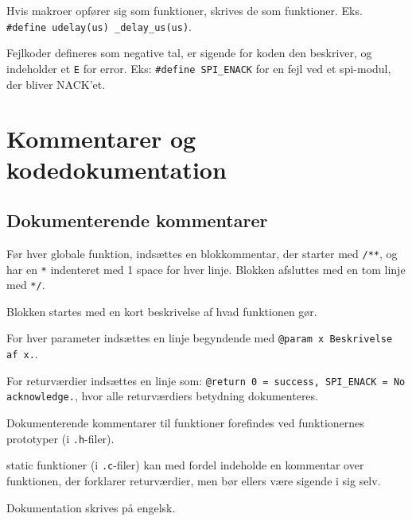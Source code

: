 \documentclass[article, 10pt]{memoir}
\let\tempone\itemize
\let\temptwo\enditemize
\renewenvironment{itemize}{\tempone\firmlist}{\temptwo}
\begin{document}
\begin{multicols}{2}
\begin{itemize}
        Hvis makroer opfører sig som funktioner, skrives de som funktioner. Eks. \texttt{\#define\ udelay(us) \_delay\_us(us)}.
    \item Fejlkoder defineres som negative tal, er sigende for koden den beskriver, og indeholder et \texttt{E} for error. Eks: \texttt{\#define SPI\_ENACK} for en fejl ved et spi-modul, der bliver NACK’et.
    \end{itemize}

    \chapter{Kommentarer og kodedokumentation}

    \section{Dokumenterende kommentarer}
    \begin{itemize}
    \item Før hver globale funktion, indsættes en blokkommentar, der starter med \texttt{/**}, og har en \texttt{*} indenteret med 1 space for hver linje. Blokken afsluttes med en tom linje med \texttt{*/}.
    \item Blokken startes med en kort beskrivelse af hvad funktionen gør.
    \item For hver parameter indsættes en linje begyndende med \texttt{@param x Beskrivelse af x.}.
    \item For returværdier indsættes en linje som: \texttt{@return 0 = success, SPI\_ENACK = No acknowledge.}, hvor alle returværdiers betydning dokumenteres.
    \item Dokumenterende kommentarer til funktioner forefindes ved funktionernes prototyper (i \texttt{.h}-filer).
    \item static funktioner (i \texttt{.c}-filer) kan med fordel indeholde en kommentar over funktionen, der forklarer returværdier, men bør ellers være sigende i sig selv.
    \item Dokumentation skrives på engelsk.
    \end{itemize}


\end{multicols}
\end{document}
